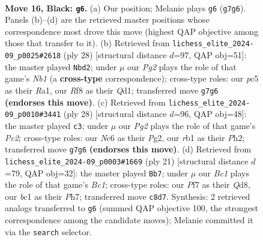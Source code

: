 \documentclass[11pt]{article}
\begin{document}
\clearpage

\begin{figure}[p]\centering
\begin{subfigure}{0.46\textwidth}\centering
\resizebox{\linewidth}{!}{%
\newchessgame
\chessboard[
  setfen={r1b2rk1/pp2qppp/2nQpn2/2P5/2P5/4P3/P1N1BPPP/1RB2RK1 b - - 10 16},
  showmover=false,
  pgfstyle=straightmove, color=movearrow, markmove={g7-g6}
]}
\caption{}
\end{subfigure}\hfill
\begin{subfigure}{0.46\textwidth}\centering
\resizebox{\linewidth}{!}{%
\newchessgame
\chessboard[
  setfen={r3r1k1/1bp1bppp/p7/np1q4/3PRB2/2P2N2/PP3PPP/RN1Q2K1 w - - 0 15},
  showmover=false,
  pgfstyle=straightmove, color=movearrow, markmove={b1-d2}
]}
\caption{}
\end{subfigure}
\\[4pt]
\begin{subfigure}{0.46\textwidth}\centering
\resizebox{\linewidth}{!}{%
\newchessgame
\chessboard[
  setfen={r1b2rk1/2p2ppp/pp2p3/3q4/1bNP4/3QB3/PPP2PPP/R4RK1 w - - 0 15},
  showmover=false,
  pgfstyle=straightmove, color=movearrow, markmove={c2-c3}
]}
\caption{}
\end{subfigure}\hfill
\begin{subfigure}{0.46\textwidth}\centering
\resizebox{\linewidth}{!}{%
\newchessgame
\chessboard[
  setfen={r1bq1rk1/p2p1ppp/1p2pn2/8/1PPQn3/P4N2/1B2PPPP/R3KB1R b KQ - 1 11},
  showmover=false,
  pgfstyle=straightmove, color=movearrow, markmove={c8-b7}
]}
\caption{}
\end{subfigure}
\caption{\textbf{Move 16, Black: \texttt{g6}.} (a) Our position; Melanie plays \texttt{g6} (\texttt{g7g6}). Panels (b)--(d) are the retrieved master positions whose correspondence most drove this move (highest QAP objective among those that transfer to it). (b) Retrieved from \texttt{lichess\_elite\_2024-09\_p0025\#2618} (ply 28) [structural distance $d$=97, QAP obj=51]: the master played \texttt{Nbd2}; under $\mu$ our \emph{Pg2} plays the role of that game's \emph{Nb1} (a \textbf{cross-type} correspondence); cross-type roles: our \emph{p}c5 as their \emph{R}a1, our \emph{R}f8 as their \emph{Q}d1; transferred move \texttt{g7g6} \textbf{(endorses this move)}. (c) Retrieved from \texttt{lichess\_elite\_2024-09\_p0010\#3441} (ply 28) [structural distance $d$=96, QAP obj=48]: the master played \texttt{c3}; under $\mu$ our \emph{Pg2} plays the role of that game's \emph{Pc2}; cross-type roles: our \emph{N}c6 as their \emph{P}g2, our \emph{r}b1 as their \emph{P}h2; transferred move \texttt{g7g6} \textbf{(endorses this move)}. (d) Retrieved from \texttt{lichess\_elite\_2024-09\_p0003\#1669} (ply 21) [structural distance $d$=79, QAP obj=32]: the master played \texttt{Bb7}; under $\mu$ our \emph{Bc1} plays the role of that game's \emph{Bc1}; cross-type roles: our \emph{P}f7 as their \emph{Q}d8, our \emph{b}c1 as their \emph{P}h7; transferred move \texttt{c8d7}. Synthesis: 2 retrieved analogs transferred to \texttt{g6} (summed QAP objective 100, the strongest correspondence among the candidate moves); Melanie committed it via the \texttt{search} selector.}
\label{fig:thought-m31}
\end{figure}
\end{document}
